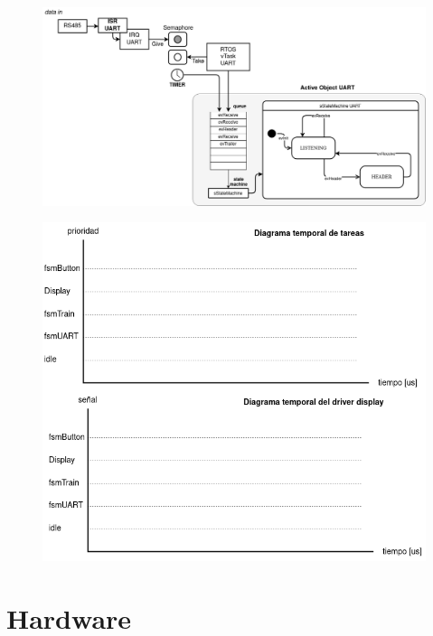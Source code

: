 \begin{figure}[ht]
	\centering
	\includegraphics[width=1\textwidth]{./Figures/fsmUART.png}
	\caption{}
	\label{fig:fsmUART}
\end{figure}


\begin{figure}[ht]
	\centering
	\includegraphics[width=1\textwidth]{./Figures/diagramasTemporales.png}
	\caption{}
	\label{fig:diagramasTemporales}
\end{figure}

\pagebreak
\section{Hardware}

